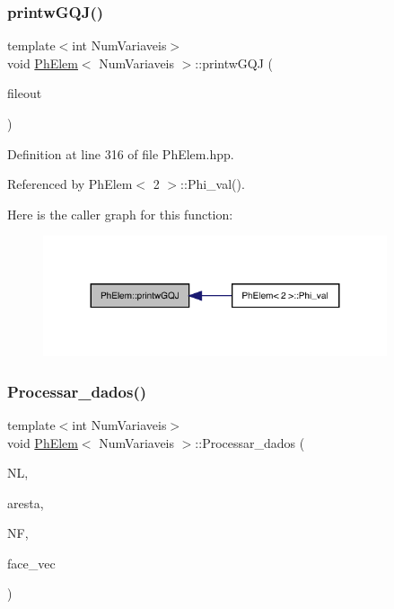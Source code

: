 \subsubsection{\texorpdfstring{printw\+G\+Q\+J()}{printwGQJ()}}
{\footnotesize\ttfamily template$<$int Num\+Variaveis$>$ \\
void \hyperlink{classPhElem}{Ph\+Elem}$<$ Num\+Variaveis $>$\+::printw\+G\+QJ (\begin{DoxyParamCaption}\item[{F\+I\+LE $\ast$}]{fileout }\end{DoxyParamCaption})}



Definition at line 316 of file Ph\+Elem.\+hpp.



Referenced by Ph\+Elem$<$ 2 $>$\+::\+Phi\+\_\+val().

Here is the caller graph for this function\+:
\nopagebreak
\begin{figure}[H]
\begin{center}
\leavevmode
\includegraphics[width=287pt]{classPhElem_a53eb1654e889d3fc893f50dcea12adcb_icgraph}
\end{center}
\end{figure}
\mbox{\label{classPhElem_a6e4284fcb95240394293c1a576deb738}} 
\subsubsection{\texorpdfstring{Processar\+\_\+dados()}{Processar\_dados()}}
{\footnotesize\ttfamily template$<$int Num\+Variaveis$>$ \\
void \hyperlink{classPhElem}{Ph\+Elem}$<$ Num\+Variaveis $>$\+::Processar\+\_\+dados (\begin{DoxyParamCaption}\item[{int \&}]{NL,  }\item[{std\+::vector$<$ \hyperlink{structARESTA}{A\+R\+E\+S\+TA} $>$ \&}]{aresta,  }\item[{int \&}]{NF,  }\item[{std\+::vector$<$ \hyperlink{structFACE}{F\+A\+CE} $>$ \&}]{face\+\_\+vec }\end{DoxyParamCaption})}



